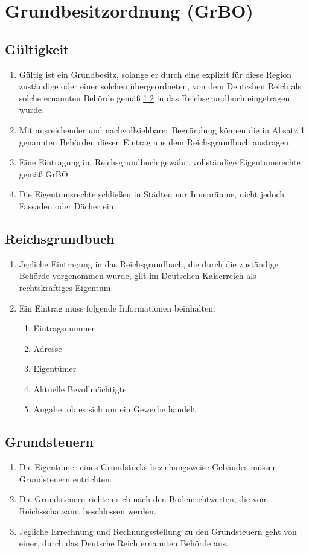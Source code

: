 \documentclass{article}
\begin{document}
\section{Grundbesitzordnung (GrBO)}
\localtableofcontents
\subsection{Gültigkeit}
\begin{enumerate}[(1)]
    \item Gültig ist ein Grundbesitz, solange er durch eine explizit für diese Region zuständige oder einer solchen übergeordneten, von dem
    Deutcshen Reich als solche ernannten Behörde gemäß \ref{rgbuch} in das Reichsgrundbuch eingetragen wurde.
    \item Mit ausreichender und nachvollziehbarer Begründung können die in Absatz 1 genannten Behörden diesen Eintrag aus dem Reichsgrundbuch austragen.
    \item Eine Eintragung im Reichsgrundbuch gewährt vollständige Eigentumsrechte gemäß GrBO.
    \item Die Eigentumsrechte schließen in Städten nur Innenräume, nicht jedoch Fassaden oder Dächer ein.
\end{enumerate}
\subsection{Reichsgrundbuch}\label{rgbuch}
\begin{enumerate}[(1)]
    \item Jegliche Eintragung in das Reichsgrundbuch, die durch die zuständige Behörde vorgenommen wurde, gilt im Deutschen Kaiserreich als rechtskräftiges Eigentum.
    \item Ein Eintrag muss folgende Informationen beinhalten:
    \begin{enumerate}[1.]
        \item Eintragsnummer
        \item Adresse
        \item Eigentümer
        \item Aktuelle Bevollmächtigte
        \item Angabe, ob es sich um ein Gewerbe handelt
    \end{enumerate}
\end{enumerate}
\subsection{Grundsteuern}
\begin{enumerate}[(1)]
    \item Die Eigentümer eines Grundstücks beziehungsweise Gebäudes müssen Grundsteuern entrichten.
    \item Die Grundsteuern richten sich nach den Bodenrichtwerten, die vom Reichsschatzamt beschlossen werden.
    \item Jegliche Errechnung und Rechnungsstellung zu den Grundsteuern geht von einer, durch das Deutsche Reich ernannten Behörde aus.
\end{enumerate}
\end{document}
